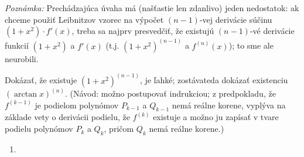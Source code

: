 \textit{Poznámka:}
Prechádzajúca úvaha má (našťastie len zdanlivo) jeden nedostatok: ak chceme použiť Leibnitzov vzorec na výpočet $(n-1)$-vej derivácie súčinu $(1+x^2)\cdot f'(x)$, treba sa najprv presvedčiť, že existujú $(n-1)$-vé derivácie funkcií $(1+x^2)$ a $f'(x)$ (t.j. $(1+x^2)^{(n-1)}$ a $f^{(n)}(x)$); to sme ale neurobili.

Dokázať, že existuje $(1+x^2)^{(n-1)}$, je ľahké; zostávateda dokázať existenciu $(\arctan x)^{(n)}$. (Návod: možno postupovať indrukciou; z predpokladu, že $f^{(k-1)}$ je podielom polynómov $P_{k-1}$ a $Q_{k-1}$ nemá reálne korene, vyplýva na základe vety o derivácii podielu, že $f^{(k)}$ existuje a možno ju zapísať v tvare podielu polynómov $P_k$ a $Q_k$, pričom $Q_k$ nemá reálne korene.)

\begin{enumerate}[resume]
	\item {}
\end{enumerate}